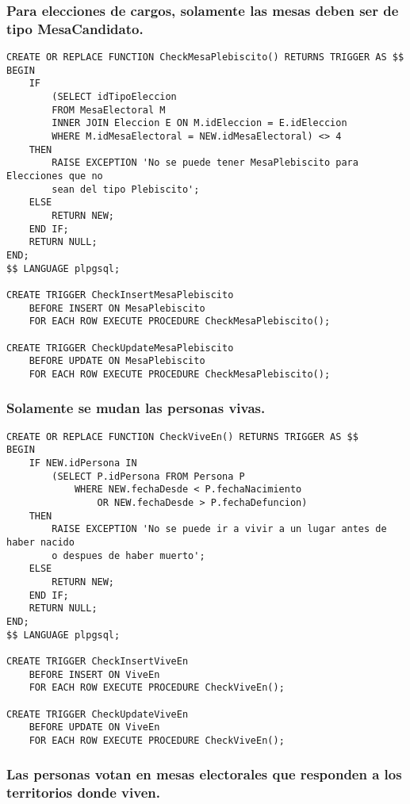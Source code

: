 \subsubsection{Para elecciones de cargos, solamente las mesas deben ser de tipo MesaCandidato.}
\begin{verbatim}
CREATE OR REPLACE FUNCTION CheckMesaPlebiscito() RETURNS TRIGGER AS $$
BEGIN
    IF 
        (SELECT idTipoEleccion 
        FROM MesaElectoral M 
        INNER JOIN Eleccion E ON M.idEleccion = E.idEleccion
        WHERE M.idMesaElectoral = NEW.idMesaElectoral) <> 4  
    THEN
        RAISE EXCEPTION 'No se puede tener MesaPlebiscito para Elecciones que no 
        sean del tipo Plebiscito';
    ELSE
        RETURN NEW;
    END IF;
    RETURN NULL;
END;
$$ LANGUAGE plpgsql;
                                        
CREATE TRIGGER CheckInsertMesaPlebiscito
    BEFORE INSERT ON MesaPlebiscito
    FOR EACH ROW EXECUTE PROCEDURE CheckMesaPlebiscito();
    
CREATE TRIGGER CheckUpdateMesaPlebiscito
    BEFORE UPDATE ON MesaPlebiscito
    FOR EACH ROW EXECUTE PROCEDURE CheckMesaPlebiscito();
\end{verbatim}

\subsubsection{Solamente se mudan las personas vivas.}
\begin{verbatim}
CREATE OR REPLACE FUNCTION CheckViveEn() RETURNS TRIGGER AS $$
BEGIN
    IF NEW.idPersona IN 
        (SELECT P.idPersona FROM Persona P 
            WHERE NEW.fechaDesde < P.fechaNacimiento 
                OR NEW.fechaDesde > P.fechaDefuncion)
    THEN
        RAISE EXCEPTION 'No se puede ir a vivir a un lugar antes de haber nacido 
        o despues de haber muerto';
    ELSE
        RETURN NEW;
    END IF;
    RETURN NULL;
END;
$$ LANGUAGE plpgsql;

CREATE TRIGGER CheckInsertViveEn
    BEFORE INSERT ON ViveEn
    FOR EACH ROW EXECUTE PROCEDURE CheckViveEn();
    
CREATE TRIGGER CheckUpdateViveEn
    BEFORE UPDATE ON ViveEn
    FOR EACH ROW EXECUTE PROCEDURE CheckViveEn();
\end{verbatim}

\subsubsection{Las personas votan en mesas electorales que responden a los territorios donde viven.}

